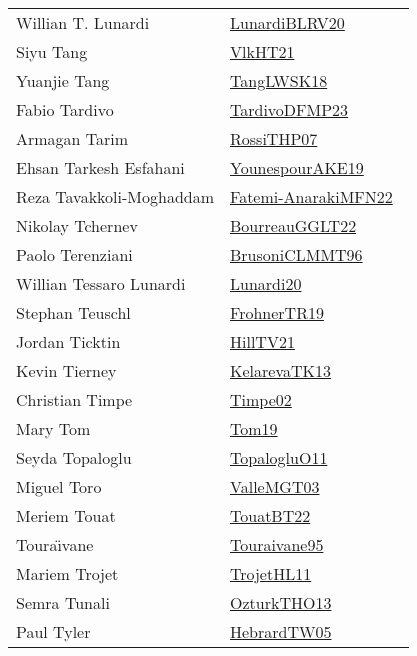 {\begin{longtable}{p{4cm}p{20cm}}
Willian T. Lunardi & \href{works/LunardiBLRV20.pdf}{LunardiBLRV20}~\cite{LunardiBLRV20}\\
Siyu Tang & \href{works/VlkHT21.pdf}{VlkHT21}~\cite{VlkHT21}\\
Yuanjie Tang & \href{works/TangLWSK18.pdf}{TangLWSK18}~\cite{TangLWSK18}\\
Fabio Tardivo & \href{works/TardivoDFMP23.pdf}{TardivoDFMP23}~\cite{TardivoDFMP23}\\
Armagan Tarim & \href{works/RossiTHP07.pdf}{RossiTHP07}~\cite{RossiTHP07}\\
Ehsan Tarkesh Esfahani & \href{works/YounespourAKE19.pdf}{YounespourAKE19}~\cite{YounespourAKE19}\\
Reza Tavakkoli-Moghaddam & \href{}{Fatemi-AnarakiMFN22}~\cite{Fatemi-AnarakiMFN22}\\
Nikolay Tchernev & \href{works/BourreauGGLT22.pdf}{BourreauGGLT22}~\cite{BourreauGGLT22}\\
Paolo Terenziani & \href{works/BrusoniCLMMT96.pdf}{BrusoniCLMMT96}~\cite{BrusoniCLMMT96}\\
Willian Tessaro Lunardi & \href{}{Lunardi20}~\cite{Lunardi20}\\
Stephan Teuschl & \href{works/FrohnerTR19.pdf}{FrohnerTR19}~\cite{FrohnerTR19}\\
Jordan Ticktin & \href{works/HillTV21.pdf}{HillTV21}~\cite{HillTV21}\\
Kevin Tierney & \href{works/KelarevaTK13.pdf}{KelarevaTK13}~\cite{KelarevaTK13}\\
Christian Timpe & \href{works/Timpe02.pdf}{Timpe02}~\cite{Timpe02}\\
Mary Tom & \href{works/Tom19.pdf}{Tom19}~\cite{Tom19}\\
Seyda Topaloglu & \href{works/TopalogluO11.pdf}{TopalogluO11}~\cite{TopalogluO11}\\
Miguel Toro & \href{works/ValleMGT03.pdf}{ValleMGT03}~\cite{ValleMGT03}\\
Meriem Touat & \href{works/TouatBT22.pdf}{TouatBT22}~\cite{TouatBT22}\\
Toura{\"{\i}}vane & \href{works/Touraivane95.pdf}{Touraivane95}~\cite{Touraivane95}\\
Mariem Trojet & \href{works/TrojetHL11.pdf}{TrojetHL11}~\cite{TrojetHL11}\\
Semra Tunali & \href{works/OzturkTHO13.pdf}{OzturkTHO13}~\cite{OzturkTHO13}\\
Paul Tyler & \href{works/HebrardTW05.pdf}{HebrardTW05}~\cite{HebrardTW05}\\

\end{longtable}}

